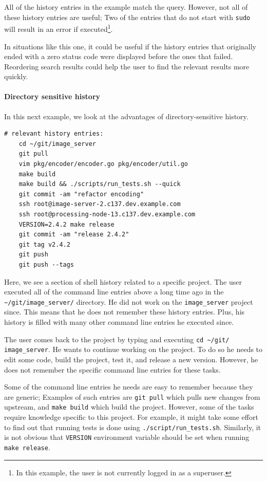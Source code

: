 All of the history entries in the example match the query. However, not all of these history entries are useful; Two of the entries that do not start with \verb|sudo| will result in an error if executed\footnote{In this example, the user is not currently logged in as a superuser.}. 

In situations like this one, it could be useful if the history entries that originally ended with a zero status code were displayed before the ones that failed. Reordering search results could help the user to find the relevant results more quickly. 

\paragraph{Directory sensitive history}

In this next example, we look at the advantages of directory-sensitive history.

\begin{verbatim}
# relevant history entries:
    cd ~/git/image_server
    git pull
    vim pkg/encoder/encoder.go pkg/encoder/util.go
    make build
    make build && ./scripts/run_tests.sh --quick
    git commit -am "refactor encoding"
    ssh root@image-server-2.c137.dev.example.com
    ssh root@processing-node-13.c137.dev.example.com
    VERSION=2.4.2 make release
    git commit -am "release 2.4.2"
    git tag v2.4.2
    git push
    git push --tags
\end{verbatim}

Here, we see a section of shell history related to a specific project. The user executed all of the command line entries above a long time ago in the \verb|~/git/image_server/| directory. He did not work on the \verb|image_server| project since. This means that he does not remember these history entries. Plus, his history is filled with many other command line entries he executed since.

The user comes back to the project by typing and executing \verb|cd ~/git/| \verb|image_server|. He wants to continue working on the project. To do so he needs to edit some code, build the project, test it, and release a new version. However, he does not remember the specific command line entries for these tasks. 

Some of the command line entries he needs are easy to remember because they are generic; Examples of such entries are \verb|git pull| which pulls new changes from upstream, and \verb|make build| which build the project. However, some of the tasks require knowledge specific to this project. For example, it might take some effort to find out that running tests is done using \verb|./script/run_tests.sh|. Similarly, it is not obvious that \verb|VERSION| environment variable should be set when running \verb|make release|.

